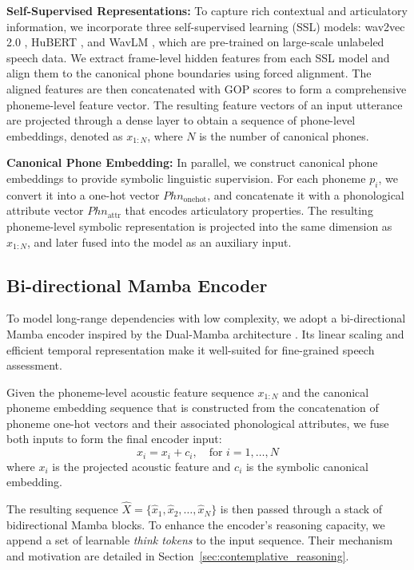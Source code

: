 \documentclass{Interspeech}
\begin{document}
\textbf{Self-Supervised Representations:}
To capture rich contextual and articulatory information, we incorporate three self-supervised learning (SSL) models: wav2vec 2.0 \cite{baevski2020wav2vec}, HuBERT \cite{hsu2021hubert}, and WavLM \cite{chen2022wavlm}, which are pre-trained on large-scale unlabeled speech data. We extract frame-level hidden features from each SSL model and align them to the canonical phone boundaries using forced alignment. The aligned features are then concatenated with GOP scores to form a comprehensive phoneme-level feature vector. The resulting feature vectors of an input utterance are projected through a dense layer to obtain a sequence of phone-level embeddings, denoted as $x_{1:N}$, where $N$ is the number of canonical phones.

\textbf{Canonical Phone Embedding:}
In parallel, we construct canonical phone embeddings to provide symbolic linguistic supervision. For each phoneme $p_i$, we convert it into a one-hot vector $Phn_{\text{onehot}}$, and concatenate it with a phonological attribute vector $Phn_{\text{attr}}$ that encodes articulatory properties. The resulting phoneme-level symbolic representation is projected into the same dimension as $x_{1:N}$, and later fused into the model as an auxiliary input.

\subsection{Bi-directional Mamba Encoder}
To model long-range dependencies with low complexity, we adopt a bi-directional Mamba encoder inspired by the Dual-Mamba architecture \cite{jiang2025dual}. Its linear scaling and efficient temporal representation make it well-suited for fine-grained speech assessment. 

Given the phoneme-level acoustic feature sequence $x_{1:N}$ and the canonical phoneme embedding sequence that is constructed from the concatenation of phoneme one-hot vectors and their associated phonological attributes, we fuse both inputs to form the final encoder input:
\begin{equation}
    \hat{x}_i = x_i + c_i, \quad \text{for } i = 1, \ldots, N
\end{equation}
where $x_i$ is the projected acoustic feature and $c_i$ is the symbolic canonical embedding.


The resulting sequence $\hat{X} = \{\hat{x}_1, \hat{x}_2, \ldots, \hat{x}_N\}$ is then passed through a stack of bidirectional Mamba blocks. To enhance the encoder’s reasoning capacity, we append a set of learnable \textit{think tokens} to the input sequence. Their mechanism and motivation are detailed in Section~\ref{sec:contemplative_reasoning}. 
\end{document}
